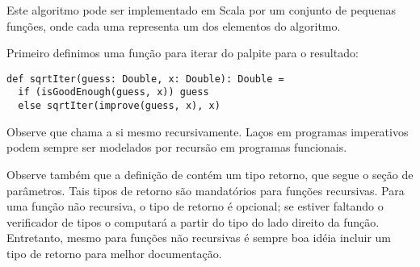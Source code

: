 

Este algoritmo pode ser implementado em Scala por um conjunto de pequenas fun\c{c}\~{o}es,
onde cada uma representa um dos elementos do algoritmo.

Primeiro definimos uma fun\c{c}\~{a}o para iterar do palpite para o resultado:


\begin{lstlisting}
def sqrtIter(guess: Double, x: Double): Double =
  if (isGoodEnough(guess, x)) guess
  else sqrtIter(improve(guess, x), x)
\end{lstlisting}

 
Observe que  chama a si mesmo recursivamente. La\c{c}os em 
programas imperativos podem sempre ser modelados por recurs\~{a}o em 
programas funcionais. 

Observe tamb\'{e}m que a defini\c{c}\~{a}o de  cont\'{e}m um tipo retorno,
que segue o se\c{c}\~{a}o de par\^{a}metros. Tais tipos de retorno s\~{a}o mandat\'{o}rios para 
fun\c{c}\~{o}es recursivas. Para uma fun\c{c}\~{a}o n\~{a}o recursiva, o tipo de retorno \'{e} opcional;
se estiver faltando o verificador de tipos o computar\'{a} a partir do tipo do lado
direito da fun\c{c}\~{a}o. Entretanto, mesmo para fun\c{c}\~{o}es n\~{a}o recursivas \'{e} sempre boa id\'{e}ia 
incluir um tipo de retorno para melhor documenta\c{c}\~{a}o.  


